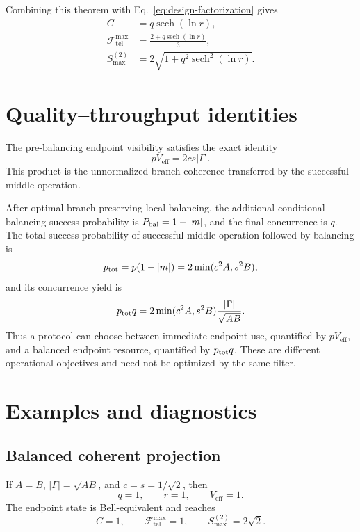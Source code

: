\documentclass[reprint,aps,pra,superscriptaddress,nofootinbib,longbibliography]{revtex4-2}
\newcommand{\sech}{\operatorname{sech}}
\newcommand{\Veff}{V_{\mathrm{eff}}}
\newcommand{\Ftel}{\mathcal F_{\mathrm{tel}}}
\begin{document}
Combining this theorem with Eq.~\eqref{eq:design-factorization} gives
\begin{align}
C&=q\sech(\ln r),\nonumber\\
\Ftel^{\max}&=\frac{2+q\sech(\ln r)}{3},\nonumber\\
S_{\max}^{(2)}&=2\sqrt{1+q^2\sech^2(\ln r)}.
\end{align}

\section{Quality--throughput identities}

The pre-balancing endpoint visibility satisfies the exact identity
\begin{equation}
p\Veff=2cs|\Gamma|.
\label{eq:quality-throughput}
\end{equation}
This product is the unnormalized branch coherence transferred by the successful middle operation.

After optimal branch-preserving local balancing, the additional conditional balancing success probability is \(P_{\rm bal}=1-|m|\), and the final concurrence is \(q\).  The total success probability of successful middle operation followed by balancing is
\begin{equation}
p_{\rm tot}=p(1-|m|)=2\min(c^2A,s^2B),
\label{eq:ptot}
\end{equation}
and its concurrence yield is
\begin{equation}
p_{\rm tot}q
=2\min(c^2A,s^2B)\frac{|\Gamma|}{\sqrt{AB}}.
\label{eq:balanced-yield}
\end{equation}
Thus a protocol can choose between immediate endpoint use, quantified by \(p\Veff\), and a balanced endpoint resource, quantified by \(p_{\rm tot}q\).  These are different operational objectives and need not be optimized by the same filter.

\section{Examples and diagnostics}

\subsection{Balanced coherent projection}

If \(A=B\), \(|\Gamma|=\sqrt{AB}\), and \(c=s=1/\sqrt2\), then
\begin{equation}
q=1,
\qquad
r=1,
\qquad
\Veff=1.
\end{equation}
The endpoint state is Bell-equivalent and reaches
\begin{equation}
C=1,
\qquad
\Ftel^{\max}=1,
\qquad
S_{\max}^{(2)}=2\sqrt2.
\end{equation}
\end{document}
